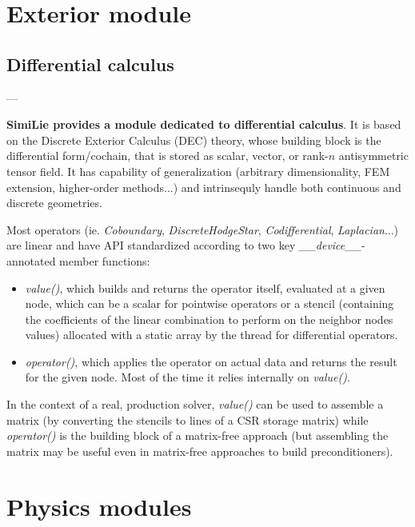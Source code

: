 \documentclass[9pt, svgnames, aspectratio=32, handout]{beamer}
\newenvironment{tframe}[1][]{%
  \begin{frame}[fragile,environment=tframe]{%
    \normalsize{{\bfseries \secname} --- \small{\subsecname} #1}%
  }%
}{%
  \end{frame}%
}
\begin{document}
\section{Exterior module}

\subsection{Differential calculus}

\begin{tframe}
\textbf{SimiLie provides a module dedicated to differential calculus}. It is based on the Discrete Exterior Calculus (DEC) theory, whose building block is the differential form/cochain, that is stored as scalar, vector, or rank-$n$ antisymmetric tensor field. It has capability of generalization (arbitrary dimensionality, FEM extension, higher-order methods...) and intrinsequly handle both continuous and discrete geometries.

Most operators (ie. \textit{Coboundary}, \textit{DiscreteHodgeStar}, \textit{Codifferential}, \textit{Laplacian}...) are linear and have API standardized according to two key \textit{\_\_device\_\_}-annotated member functions:

\begin{itemize}
\item \textit{value()}, which builds and returns the operator itself, evaluated at a given node, which can be a scalar for pointwise operators or a stencil (containing the coefficients of the linear combination to perform on the neighbor nodes values) allocated with a static array by the thread for differential operators.
\item \textit{operator()}, which applies the operator on actual data and returns the result for the given node. Most of the time it relies internally on \textit{value()}.
\end{itemize}

In the context of a real, production solver, \textit{value()} can be used to assemble a matrix (by converting the stencils to lines of a CSR storage matrix) while \textit{operator()} is the building block of a matrix-free approach (but assembling the matrix may be useful even in matrix-free approaches to build preconditioners).

\end{tframe}

\section{Physics modules}
\end{document}
